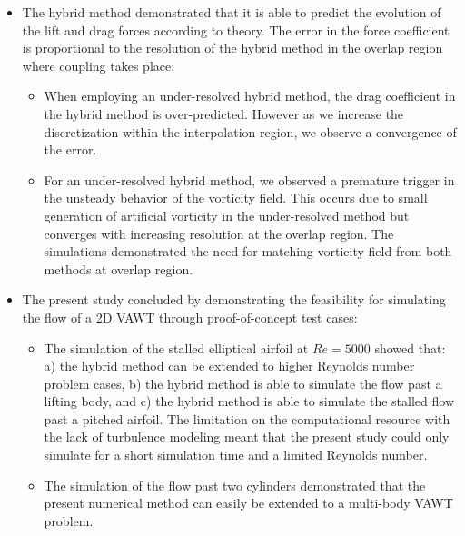 \begin{itemize}
\item The hybrid method demonstrated that it is able to predict the evolution of the lift and drag forces according to theory. The error in the force coefficient is proportional to the resolution of the hybrid method in the overlap region where coupling takes place:

	\begin{itemize}
	\item When employing an under-resolved hybrid method, the drag coefficient in the hybrid method is over-predicted. However as we increase the discretization within the interpolation region, we observe a convergence of the error.
	\item For an under-resolved hybrid method, we observed a premature trigger in the unsteady behavior of the vorticity field. This occurs due to small generation of artificial vorticity in the under-resolved method but converges with increasing resolution at the overlap region. The simulations demonstrated the need for matching vorticity field from both methods at overlap region.
	\end{itemize}
	
\item The present study concluded by demonstrating the feasibility for simulating the flow of a 2D VAWT through proof-of-concept test cases:

	\begin{itemize}
	\item The simulation of the stalled elliptical airfoil at $Re=5000$ showed that: a) the hybrid method can be extended to higher Reynolds number problem cases, b) the hybrid method is able to simulate the flow past a lifting body, and c) the hybrid method is able to simulate the stalled flow past a pitched airfoil. The limitation on the computational resource with the lack of turbulence modeling meant that the present study could only simulate for a short simulation time and a limited Reynolds number.
	\item The simulation of the flow past two cylinders demonstrated that the present numerical method can easily be extended to a multi-body VAWT problem.
	\end{itemize}

\end{itemize}







